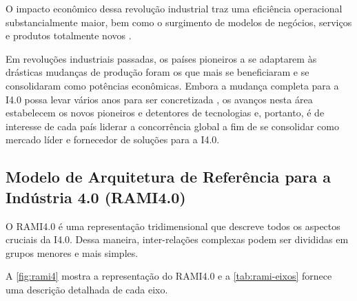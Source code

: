 O impacto econômico dessa revolução industrial traz uma eficiência operacional substancialmente maior, bem como o surgimento de modelos de negócios, serviços e produtos totalmente novos \cite{hermann2016design}.

Em revoluções industriais passadas, os países pioneiros a se adaptarem às drásticas mudanças de produção foram os que mais se beneficiaram e se consolidaram como potências econômicas. Embora a mudança completa para a I4.0 possa levar vários anos para ser concretizada \cite{russmann2015industryfour}, os avanços nesta área estabelecem os novos pioneiros e detentores de tecnologias e, portanto, é de interesse de cada país liderar a concorrência global a fim de se consolidar como mercado líder e fornecedor de soluções para a I4.0.

\subsection{Modelo de Arquitetura de Referência para a Indústria 4.0 (RAMI4.0)}
\label{sub:rami4}

O RAMI4.0 é uma representação tridimensional que descreve todos os aspectos cruciais da I4.0. Dessa maneira, inter-relações complexas podem ser divididas em grupos menores e mais simples.

A \autoref{fig:rami4} mostra a representação do RAMI4.0 e a \autoref{tab:rami-eixos} fornece uma descrição detalhada de cada eixo.

